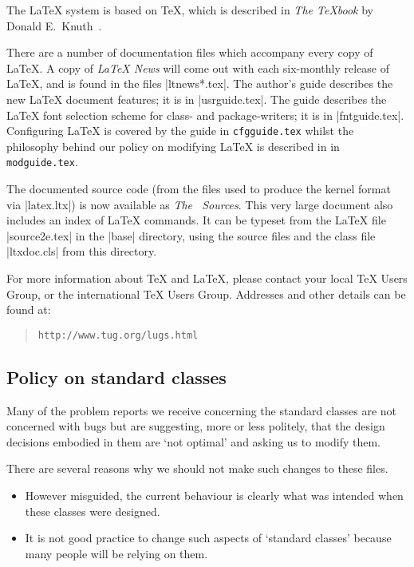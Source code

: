 \documentclass[11pt]{ltxguide}[1995/11/28]
\begin{document}
The \LaTeX{} system is based on \TeX{}, which is
described in \emph{The \TeX book} by Donald E.~Knuth~\cite{A-W:DEK91}.

There are a number of documentation files which accompany every copy
of \LaTeX{}.  A copy of \emph{\LaTeX{} News} will come out with each
six-monthly release of \LaTeX{}, and is found in the files
|ltnews*.tex|.  The author's guide \emph{\usrguide} describes the new
\LaTeX{} document features; it is in |usrguide.tex|.  The guide
\emph{\fntguide} describes the \LaTeX{} font selection scheme for
class- and package-writers; it is in |fntguide.tex|. Configuring
\LaTeX{} is covered by the guide \emph{\cfgguide} in
\texttt{cfgguide.tex} whilst the philosophy behind our policy on
modifying \LaTeX{} is described in \emph{\modguide} in
\texttt{modguide.tex}.

The documented source code (from the files used to produce the kernel
format via |latex.ltx|) is now available as
\emph{The \LaTeXe\ Sources}.
This very large document also includes an index of
\LaTeX{} commands.  It can be typeset from the \LaTeX{} file
|source2e.tex| in the |base| directory, using the source files and
the class file |ltxdoc.cls| from this directory.

For more information about \TeX{} and \LaTeX{}, please contact your
local \TeX{} Users Group, or the international \TeX{} Users Group.
Addresses and other details can be found at:
\begin{quote}\small\label{addrs}
    \texttt{http://www.tug.org/lugs.html}
\end{quote}


\subsection{Policy on standard classes}

Many of the problem reports we receive concerning the standard classes
are not concerned with bugs but are suggesting, more or less politely,
that the design decisions embodied in them are `not optimal' and
asking us to modify them.

There are several reasons why we should not make such changes to these
files.
\begin{itemize}
\item
  However misguided, the current behaviour is clearly what was
  intended when these classes were designed.
\item
  It is not good practice to change such aspects of `standard classes'
  because many people will be relying on them.
\end{itemize}
\end{document}
